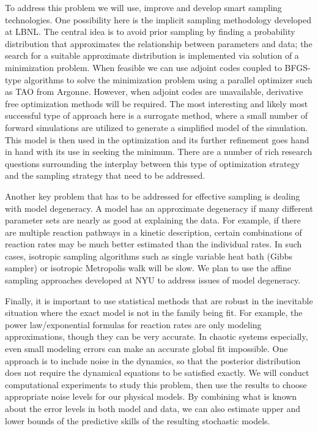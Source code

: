\documentclass[11pt]{article}
\begin{document}
To address this problem we will use, improve and develop smart sampling technologies.
One possibility here is the implicit sampling methodology developed at LBNL.
The central idea is to avoid prior sampling by finding a probability distribution that approximates the
relationship between parameters and data; the search for a suitable approximate distribution is implemented
via solution of a minimization problem.
When feasible we can use adjoint codes coupled to BFGS-type algorithms to solve the minimization problem
using a parallel optimizer such as TAO from Argonne.
However, when adjoint codes are unavailable, derivative free optimization methods will be required.
The most interesting and likely most successful type of approach here is a surrogate method,
where a small number of forward simulations are utilized to generate a simplified model of the simulation.
This model is then used in the optimization and its further refinement goes hand in hand with its use
in seeking the minimum.
There are a number of rich research questions surrounding the interplay between this type of optimization strategy and
the sampling strategy that need to be addressed.

Another key problem that has to be addressed for effective sampling is dealing with model degeneracy.
A model has an approximate degeneracy if many different parameter sets are nearly as good at explaining the data.
For example, if there are multiple reaction pathways in a kinetic description, certain combinations of reaction rates may be much better
estimated than the individual rates.
In such cases, isotropic sampling algorithms such as single variable heat bath (Gibbs sampler) or isotropic
Metropolis walk will be slow. We plan to use the affine sampling approaches developed at NYU to address issues of model degeneracy.

Finally, it is important to use statistical methods that are robust in the inevitable situation where the exact model is not in
the family being fit.
For example, the power law/exponential formulas for reaction rates are only modeling approximations, though they can be
very accurate.
In chaotic systems especially, even small modeling errors can make an accurate global fit impossible.
One approach is to include noise in the dynamics, so that the posterior distribution does not require the
dynamical equations to be satisfied exactly.
We will conduct computational experiments to study this problem, then use the results to 
choose appropriate noise levels for our physical models.
By combining what is known about the error levels in both model and data, we can also estimate upper and lower bounds
of the predictive skills of the resulting stochastic models.
\end{document}
